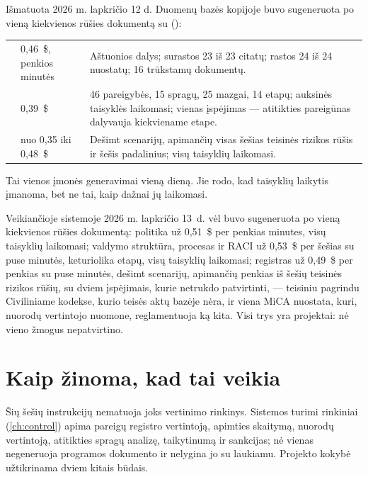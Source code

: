 \begin{lessonbox}{Išmatuota 2026 m. lapkričio 12 d.}
Duomenų bazės kopijoje \demo{} buvo sugeneruota po vieną kiekvienos rūšies dokumentą su
 ():

\begin{tabularx}{\linewidth}{@{}L{24mm}L{22mm}Y@{}}
\toprule
{} &  &  \\
\midrule
{} & 0,46~\$, penkios minutės & Aštuonios dalys; surastos 23 iš 23 citatų; rastos 24 iš 24 nuostatų; 16 trūkstamų dokumentų. \\
 & 0,39~\$ & 46 pareigybės, 15 spragų, 25 mazgai, 14 etapų; auksinės taisyklės laikomasi; vienas įspėjimas --- atitikties pareigūnas dalyvauja kiekviename etape. \\
 & nuo 0,35 iki 0,48~\$ & Dešimt scenarijų, apimančių visas šešias teisinės rizikos rūšis ir šešis padalinius; visų taisyklių laikomasi. \\
\bottomrule
\end{tabularx}

\smallskip
Tai vienos įmonės generavimai vieną dieną. Jie rodo, kad taisyklių laikytis įmanoma, bet ne
tai, kaip dažnai jų laikomasi.

Veikiančioje sistemoje 2026 m. lapkričio 13~d. \demo{} vėl buvo sugeneruota po vieną kiekvienos
rūšies dokumentą: politika už 0,51~\$ per penkias minutes, visų taisyklių laikomasi; valdymo
struktūra, procesas ir RACI už 0,53~\$ per šešias su puse minutės, keturiolika etapų, visų
taisyklių laikomasi; registras už 0,49~\$ per penkias su puse minutės, dešimt scenarijų,
apimančių penkias iš šešių teisinės rizikos rūšių, su dviem įspėjimais, kurie netrukdo
patvirtinti, --- teisiniu pagrindu Civiliniame kodekse, kurio teisės aktų bazėje nėra, ir viena
MiCA nuostata, kuri, nuorodų vertintojo nuomone, reglamentuoja ką kita. Visi trys yra projektai: nė
vieno žmogus nepatvirtino.
\end{lessonbox}


\section{Kaip žinoma, kad tai veikia}\label{sec:programme:evaluation}

Šių šešių instrukcijų nematuoja joks vertinimo rinkinys. Sistemos turimi rinkiniai
(\cref{ch:control}) apima pareigų registro vertintoją, apimties skaitymą, nuorodų vertintoją,
atitikties spragų analizę, taikytinumą ir sankcijas; nė vienas negeneruoja programos dokumento
ir nelygina jo su laukiamu. Projekto kokybė užtikrinama dviem kitais būdais.

